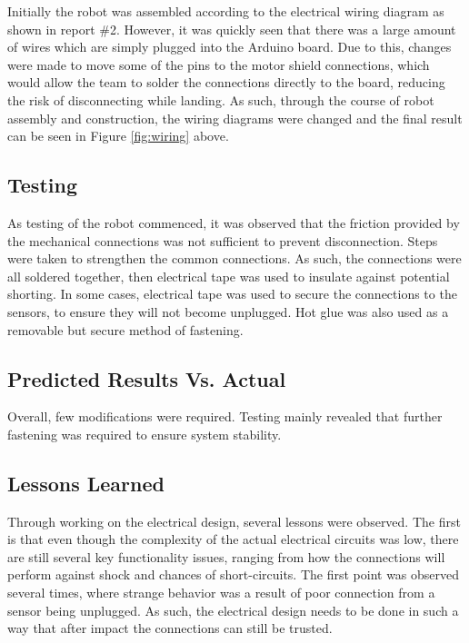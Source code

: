 \documentclass[ece]{uw-wkrpt}
\begin{document}
Initially the robot was assembled according to the electrical wiring diagram as shown in report \#2. However, it was quickly seen that there was a large amount of wires which are simply plugged into the Arduino board. Due to this, changes were made to move some of the pins to the motor shield connections, which would allow the team to solder the connections directly to the board, reducing the risk of disconnecting while landing. As such, through the course of robot assembly and construction, the wiring diagrams were changed and the final result can be seen in Figure \ref{fig:wiring} above.

\subsection{Testing} 

As testing of the robot commenced, it was observed that the friction provided by the mechanical connections was not sufficient to prevent disconnection. Steps were taken to strengthen the common connections. As such, the connections were all soldered together, then electrical tape was used to insulate against potential shorting. In some cases, electrical tape was used to secure the connections to the sensors, to ensure they will not become unplugged. Hot glue was also used as a removable but secure method of fastening.

\subsection{Predicted Results Vs. Actual} 

Overall, few modifications were required. Testing mainly revealed that further fastening was required to ensure system stability.

\subsection{Lessons Learned}

Through working on the electrical design, several lessons were observed. The first is that even though the complexity of the actual electrical circuits was low, there are still several key functionality issues, ranging from how the connections will perform against shock and chances of short-circuits. The first point was observed several times, where strange behavior was a result of poor connection from a sensor being unplugged. As such, the electrical design needs to be done in such a way that after impact the connections can still be trusted. 
\end{document}
